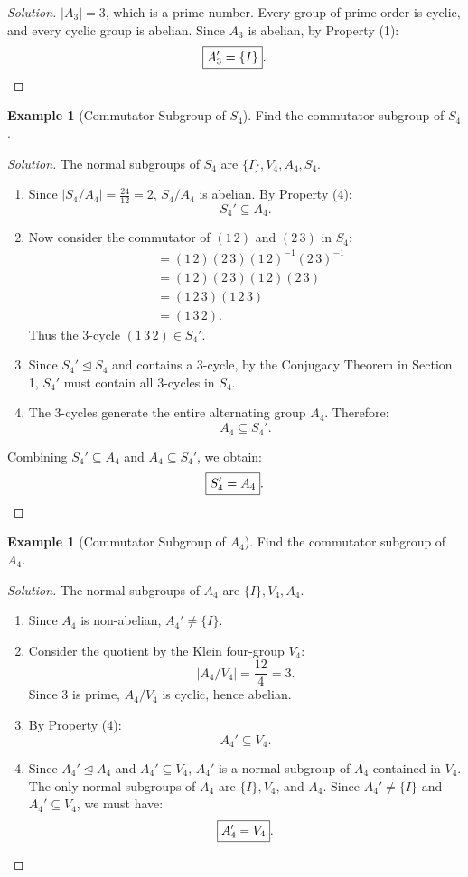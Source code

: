 \documentclass[12pt]{article}
\theoremstyle{definition}
\newtheorem{example}[definition]{Example}
\theoremstyle{plain}
\begin{document}
\begin{proof}[Solution]
$|A_3| = 3$, which is a prime number.
Every group of prime order is cyclic, and every cyclic group is abelian.
Since $A_3$ is abelian, by Property (1):
\[
\boxed{A_3' = \{I\}}. \qedhere
\]
\end{proof}

\begin{example}[Commutator Subgroup of $S_4$]
Find the commutator subgroup of $S_4$.
\end{example}

\begin{proof}[Solution]
The normal subgroups of $S_4$ are $\{I\}, V_4, A_4, S_4$.
\begin{enumerate}
    \item Since $|S_4/A_4| = \frac{24}{12} = 2$, $S_4/A_4$ is abelian.
    By Property (4):
    \[
    S_4' \subseteq A_4.
    \]
    \item Now consider the commutator of $(1\,2)$ and $(2\,3)$ in $S_4$:
    \begin{align*}
    [(1\,2), (2\,3)] &= (1\,2)(2\,3)(1\,2)^{-1}(2\,3)^{-1} \\
    &= (1\,2)(2\,3)(1\,2)(2\,3) \\
    &= (1\,2\,3)(1\,2\,3) \\
    &= (1\,3\,2).
    \end{align*}
    Thus the 3-cycle $(1\,3\,2) \in S_4'$.
    \item Since $S_4' \trianglelefteq S_4$ and contains a 3-cycle, by the Conjugacy Theorem in Section 1, $S_4'$ must contain all 3-cycles in $S_4$.
    \item The 3-cycles generate the entire alternating group $A_4$.
    Therefore:
    \[
    A_4 \subseteq S_4'.
    \]
\end{enumerate}
Combining $S_4' \subseteq A_4$ and $A_4 \subseteq S_4'$, we obtain:
\[
\boxed{S_4' = A_4}. \qedhere
\]
\end{proof}

\begin{example}[Commutator Subgroup of $A_4$]
Find the commutator subgroup of $A_4$.
\end{example}

\begin{proof}[Solution]
The normal subgroups of $A_4$ are $\{I\}, V_4, A_4$.
\begin{enumerate}
    \item Since $A_4$ is non-abelian, $A_4' \neq \{I\}$.
    \item Consider the quotient by the Klein four-group $V_4$:
    \[
    |A_4/V_4| = \frac{12}{4} = 3.
    \]
    Since 3 is prime, $A_4/V_4$ is cyclic, hence abelian.
    \item By Property (4):
    \[
    A_4' \subseteq V_4.
    \]
    \item Since $A_4' \trianglelefteq A_4$ and $A_4' \subseteq V_4$, $A_4'$ is a normal subgroup of $A_4$ contained in $V_4$.
    The only normal subgroups of $A_4$ are $\{I\}, V_4$, and $A_4$.
    Since $A_4' \neq \{I\}$ and $A_4' \subseteq V_4$, we must have:
    \[
    \boxed{A_4' = V_4}. \qedhere
    \]
\end{enumerate}
\end{proof}
\end{document}
